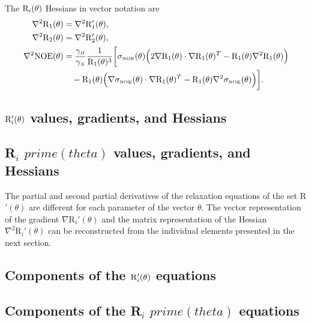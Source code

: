 The $\mathrm{R}_i(\theta)$ Hessians in vector notation are
\begin{subequations}
\begin{align}
    \nabla^2 \mathrm{R}_1(\theta) & = \nabla^2 \mathrm{R}_1'(\theta), \label{eq: Ri trans: d2R1} \\
    \nabla^2 \mathrm{R}_2(\theta) & = \nabla^2 \mathrm{R}_2'(\theta), \label{eq: Ri trans: d2R2} \\
    \nabla^2 \mathrm{NOE}(\theta) & = \frac{\gamma_{\scriptscriptstyle H}}{\gamma_{\scriptscriptstyle X}} \frac{1}{\mathrm{R}_1(\theta)^3} \bigg[
        \sigma_{\scriptscriptstyle \mathrm{NOE}}(\theta) \Big( 2 \nabla \mathrm{R}_1(\theta) \cdot \nabla \mathrm{R}_1(\theta)^T - \mathrm{R}_1(\theta) \nabla^2 \mathrm{R}_1(\theta) \Big) \nonumber\\
        & \quad - \mathrm{R}_1(\theta) \Big( \nabla \sigma_{\scriptscriptstyle \mathrm{NOE}}(\theta) \cdot \nabla \mathrm{R}_1(\theta)^T - \mathrm{R}_1(\theta) \nabla^2 \sigma_{\scriptscriptstyle \mathrm{NOE}}(\theta) \Big)
    \bigg]. \label{eq: Ri trans: d2NOE}
\end{align}
\end{subequations}




\newpage
\begin{latexonly}
    \section{$\mathrm{R}_i'(\theta)$ values, gradients, and Hessians}
\end{latexonly}
\begin{htmlonly}
    \section{R$_i$ $prime(theta)$ values, gradients, and Hessians}
\end{htmlonly}

The partial and second partial derivatives of the relaxation equations of the set R$'(\theta)$ are different for each parameter of the vector $\theta$.
The vector representation of the gradient $\nabla \textrm{R}_i'(\theta)$ and the matrix representation of the Hessian $\nabla^2 \textrm{R}_i'(\theta)$ can be reconstructed from the individual elements presented in the next section.



\begin{latexonly}
    \subsection{Components of the $\mathrm{R}_i'(\theta)$ equations}
\end{latexonly}
\begin{htmlonly}
    \subsection{Components of the R$_i$ $prime(theta)$ equations}
\end{htmlonly}


